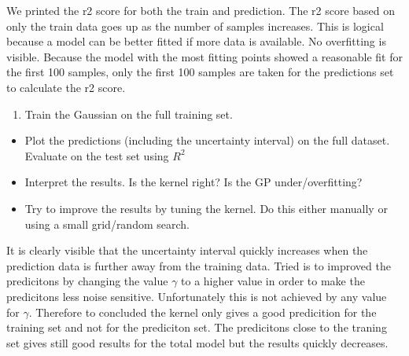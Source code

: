 \documentclass[11pt]{article}
\providecommand{\tightlist}{%
      \setlength{\itemsep}{0pt}\setlength{\parskip}{0pt}}
\begin{document}
We printed the r2 score for both the train and prediction. The r2 score
based on only the train data goes up as the number of samples increases.
This is logical because a model can be better fitted if more data is
available. No overfitting is visible. Because the model with the most
fitting points showed a reasonable fit for the first 100 samples, only
the first 100 samples are taken for the predictions set to calculate the
r2 score.

\begin{enumerate}
\def\labelenumi{\arabic{enumi}.}
\setcounter{enumi}{1}
\tightlist
\item
  Train the Gaussian on the full training set.
\end{enumerate}

\begin{itemize}
\tightlist
\item
  Plot the predictions (including the uncertainty interval) on the full
  dataset. Evaluate on the test set using \(R^2\)
\item
  Interpret the results. Is the kernel right? Is the GP
  under/overfitting?
\item
  Try to improve the results by tuning the kernel. Do this either
  manually or using a small grid/random search.
\end{itemize}

It is clearly visible that the uncertainty interval quickly increases
when the prediction data is further away from the training data. Tried
is to improved the predicitons by changing the value \(\gamma\) to a
higher value in order to make the predicitons less noise sensitive.
Unfortunately this is not achieved by any value for \(\gamma\).
Therefore to concluded the kernel only gives a good predicition for the
training set and not for the prediciton set. The predicitons close to
the traning set gives still good results for the total model but the
results quickly decreases.
\end{document}
